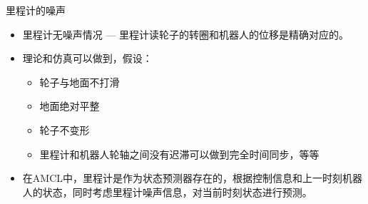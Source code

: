 \begin{frame}{里程计的噪声}
  \begin{itemize}
  \item 里程计无噪声情况 --- 里程计读轮子的转圈和机器人的位移是精确对应的。
  \item   理论和仿真可以做到，假设：
    \begin{itemize}
      \item 轮子与地面不打滑
      \item 地面绝对平整
      \item 轮子不变形
      \item 里程计和机器人轮轴之间没有迟滞可以做到完全时间同步，等等
    \end{itemize}
  \item 在AMCL中，里程计是作为状态预测器存在的，根据控制信息和上一时刻机器人的状态，同时考虑里程计噪声信息，对当前时刻状态进行预测。
  \end{itemize}
\end{frame}  



